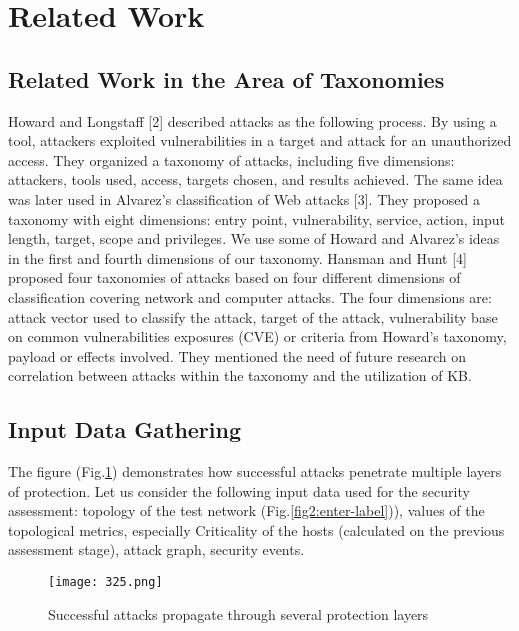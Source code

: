 \documentclass{ledger}
\begin{document}
\tableofcontents
\newpage

\section{Related Work}
\subsection{Related Work in the Area of Taxonomies}
Howard and Longstaff [2] described attacks as the following process. By using a tool, attackers exploited vulnerabilities in a target and attack for an unauthorized access. They organized a taxonomy of attacks, including five dimensions: attackers, tools used, access, targets chosen, and results achieved. The same idea was later used in Alvarez’s classification of Web attacks [3]. They proposed a taxonomy with eight dimensions: entry point, vulnerability, service, action, input length, target, scope and privileges. We use some of Howard and Alvarez’s ideas in the first and fourth dimensions of our taxonomy. Hansman and Hunt [4] proposed four taxonomies of attacks based on four different dimensions of classification covering network and computer attacks. The four dimensions are: attack vector used to classify the attack, target of the attack, vulnerability base on common vulnerabilities exposures (CVE) or criteria from Howard’s taxonomy, payload or effects involved. They mentioned the need of future research on correlation between attacks within the taxonomy and the utilization of KB.  

\subsection{Input Data Gathering}
The figure (Fig.\ref{fig1:enter-label}) demonstrates how successful attacks penetrate multiple layers of protection. Let us consider the following input data used for the security assessment: topology of the test network (Fig.\ref{fig2:enter-label})), values of the topological metrics, especially Criticality of the hosts (calculated on the previous assessment stage), attack graph, security events.\\

\begin{figure}[H]
    \centering
    \texttt{[image: 325.png]}
    \caption{Successful attacks propagate through several protection layers}
    \label{fig1:enter-label}
\end{figure}
\
\end{document}
